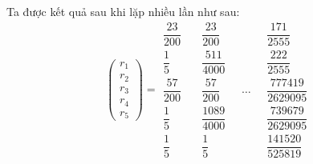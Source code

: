 Ta được kết quả sau khi lặp nhiều lần như sau: \\
                $$
                \begin{pmatrix}
                    r_1 \\[15pt]
                    r_2 \\[15pt]
                    r_3 \\[15pt]
                    r_4 \\[15pt]
                    r_5 
                \end{pmatrix}
                =
                \begin{matrix}
                    \dfrac{23}{200} \\[10pt]
                    \dfrac{1}{5} \\[10pt]
                    \dfrac{57}{200}\\[10pt]
                    \dfrac{1}{5} \\[10pt]
                    \dfrac{1}{5}
                \end{matrix}
                \quad
                \begin{matrix}
                    \dfrac{23}{200} \\[10pt]
                    \dfrac{511}{4000} \\[10pt]
                    \dfrac{57}{200}\\[10pt]
                    \dfrac{1089}{4000} \\[10pt]
                    \dfrac{1}{5}
                \end{matrix}
                \quad
                \ldots
                \quad
                \begin{matrix}
                    \dfrac{171}{2555} \\[10pt]
                    \dfrac{222}{2555} \\[10pt]
                    \dfrac{777419}{2629095} \\[10pt]
                    \dfrac{739679}{2629095} \\[10pt]
                    \dfrac{141520}{525819}
                \end{matrix}
                $$